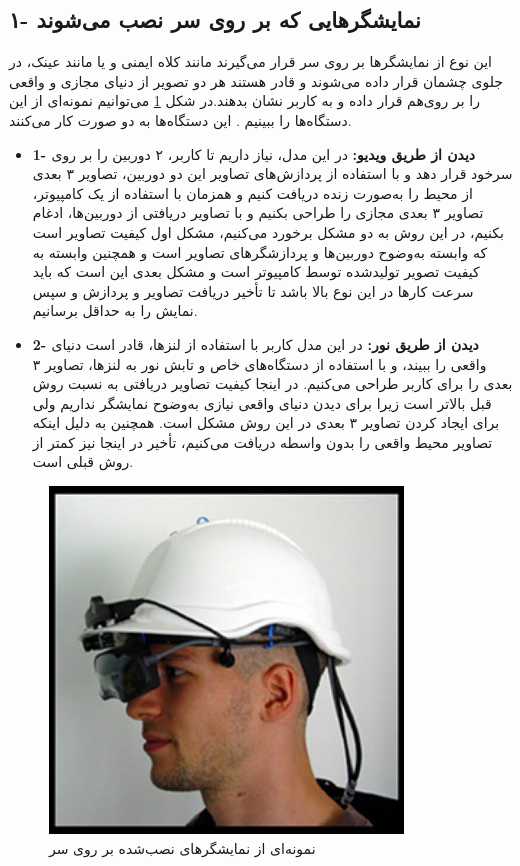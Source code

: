\subsection{
	۱- نمایشگرهایی که بر روی سر نصب می‌شوند\protect{} }این نوع از نمایشگرها بر روی سر قرار می‌گیرند مانند کلاه ایمنی و یا مانند عینک، در جلوی چشمان قرار داده می‌شوند و  قادر هستند هر دو تصویر از دنیای مجازی و واقعی را بر روی‌هم قرار داده و به کاربر نشان بدهند.در شکل \ref{fig:hmd} می‌توانیم نمونه‌ای از این دستگاه‌ها را ببینیم
	. این دستگاه‌ها به دو صورت کار می‌کنند.
\begin{itemize}
	\item \textbf{1- دیدن از طریق ویدیو:} در این مدل، نیاز داریم تا کاربر، ۲ دوربین را بر روی سرخود قرار دهد و با استفاده از پردازش‌های تصاویر این دو دوربین، تصاویر ۳ بعدی از محیط را  به‌صورت زنده دریافت کنیم و همزمان با استفاده از یک کامپیوتر، تصاویر ۳ بعدی مجازی را طراحی بکنیم و با تصاویر دریافتی از دوربین‌ها، ادغام بکنیم، در این روش به دو مشکل برخورد می‌کنیم، مشکل اول کیفیت تصاویر است که وابسته به‌وضوح  دوربین‌ها و پردازشگرهای تصاویر است و همچنین وابسته به کیفیت تصویر تولیدشده توسط کامپیوتر است و مشکل بعدی این است که باید سرعت کارها در این نوع بالا باشد تا تأخیر دریافت تصاویر و پردازش و سپس نمایش را به حداقل برسانیم.
	\item \textbf{
		2- دیدن از طریق نور: }در این مدل کاربر با استفاده از لنزها، قادر است دنیای واقعی را ببیند، و با استفاده از دستگاه‌های خاص و تابش نور به لنزها، تصاویر ۳ بعدی را برای کاربر طراحی می‌کنیم. در اینجا کیفیت تصاویر دریافتی به نسبت روش قبل بالاتر است زیرا برای دیدن دنیای واقعی نیازی به‌وضوح نمایشگر نداریم ولی برای ایجاد کردن تصاویر ۳ بعدی در این روش مشکل است. همچنین به دلیل اینکه تصاویر محیط واقعی را بدون واسطه دریافت می‌کنیم، تأخیر در اینجا نیز کمتر از روش قبلی است.
\end{itemize}

\begin{figure}[tb]
	\centering
	\includegraphics[width=0.6\linewidth]{image/hmd}
	\caption {نمونه‌ای از نمایشگرهای نصب‌شده بر روی سر\cite{Julie}}
	\label{fig:hmd}
\end{figure}

